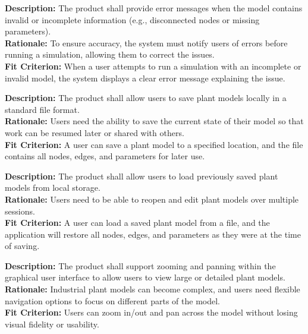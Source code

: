 \documentclass[12pt]{article}
\begin{document}
  \vspace{0.5cm}
  
  \begin{tcolorbox}[title=FR4]
  \textbf{Description:} The product shall provide error messages when the model contains invalid or incomplete information (e.g., disconnected nodes or missing parameters). \\
  \textbf{Rationale:} To ensure accuracy, the system must notify users of errors before running a simulation, allowing them to correct the issues. \\
  \textbf{Fit Criterion:} When a user attempts to run a simulation with an incomplete or invalid model, the system displays a clear error message explaining the issue.
  \end{tcolorbox}
  
  \vspace{0.5cm}

\begin{tcolorbox}[title=FR5]
\textbf{Description:} The product shall allow users to save plant models locally in a standard file format. \\
\textbf{Rationale:} Users need the ability to save the current state of their model so that work can be resumed later or shared with others. \\
\textbf{Fit Criterion:} A user can save a plant model to a specified location, and the file contains all nodes, edges, and parameters for later use.
\end{tcolorbox}

\vspace{0.5cm}

\begin{tcolorbox}[title=FR6]
\textbf{Description:} The product shall allow users to load previously saved plant models from local storage. \\
\textbf{Rationale:} Users need to be able to reopen and edit plant models over multiple sessions. \\
\textbf{Fit Criterion:} A user can load a saved plant model from a file, and the application will restore all nodes, edges, and parameters as they were at the time of saving.
\end{tcolorbox}

\vspace{0.5cm}

\begin{tcolorbox}[title=FR7]
\textbf{Description:} The product shall support zooming and panning within the graphical user interface to allow users to view large or detailed plant models. \\
\textbf{Rationale:} Industrial plant models can become complex, and users need flexible navigation options to focus on different parts of the model. \\
\textbf{Fit Criterion:} Users can zoom in/out and pan across the model without losing visual fidelity or usability.
\end{tcolorbox}
\end{document}
